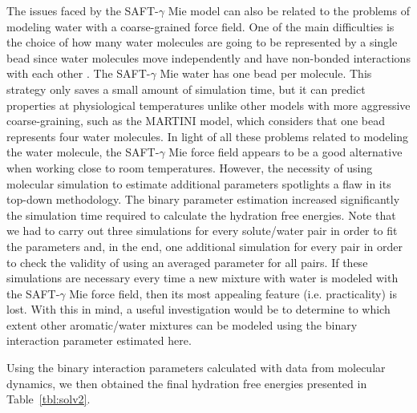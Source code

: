 \documentclass[preprint]{elsarticle}
\begin{document}
	The issues faced by the SAFT-$\gamma$ Mie model can also be related to the problems of modeling water with a coarse-grained force field.
	One of the main difficulties is the choice of how many water molecules are going to be represented by a single bead since water molecules move independently and have non-bonded interactions with each other \cite{hadley2010,hadley2012}.
	The SAFT-$\gamma$ Mie water has one bead per molecule.
	This strategy only saves a small amount of simulation time, but it can predict properties at physiological temperatures unlike other models with more aggressive coarse-graining, such as the MARTINI model, which considers that one bead represents four water molecules.
	In light of all these problems related to modeling the water molecule, the SAFT-$\gamma$ Mie force field appears to be a good alternative when working close to room temperatures.
	However, the necessity of using molecular simulation to estimate additional parameters spotlights a flaw in its top-down methodology.
	The binary parameter estimation increased significantly the simulation time required to calculate the hydration free energies.
	Note that we had to carry out three simulations for every solute/water pair in order to fit the parameters and, in the end, one additional simulation for every pair in order to check the validity of using an averaged parameter for all pairs.
	If these simulations are necessary every time a new mixture with water is modeled with the SAFT-$\gamma$ Mie force field, then its most appealing feature (i.e. practicality) is lost.
	With this in mind, a useful investigation would be to determine to which extent other aromatic/water mixtures can be modeled using the binary interaction parameter estimated here.
	
	Using the binary interaction parameters calculated with data from molecular dynamics, we then obtained the final hydration free energies presented in Table~\ref{tbl:solv2}.
	
\end{document}
